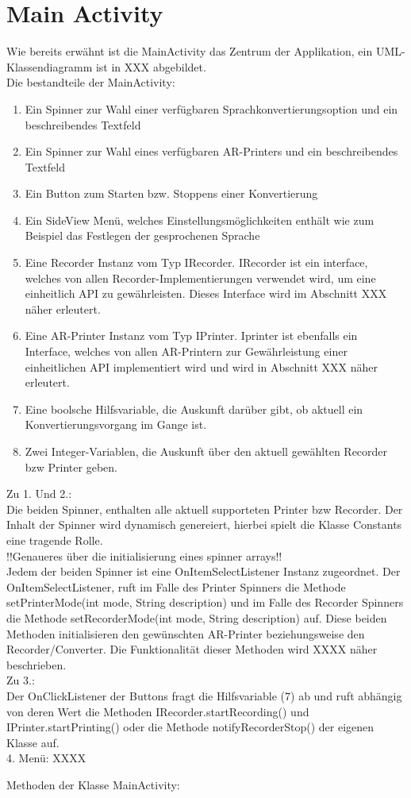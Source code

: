 \section{Main Activity}
Wie bereits erwähnt ist die MainActivity das Zentrum der Applikation, ein UML-Klassendiagramm ist in XXX abgebildet.\\
Die bestandteile der MainActivity:
\begin{enumerate}
	\item Ein Spinner zur Wahl einer verfügbaren Sprachkonvertierungsoption und ein beschreibendes Textfeld
	\item Ein Spinner zur Wahl eines verfügbaren AR-Printers und ein beschreibendes Textfeld
	\item Ein Button zum Starten bzw. Stoppens einer Konvertierung
	\item Ein SideView Menü, welches Einstellungsmöglichkeiten enthält wie zum Beispiel das Festlegen der gesprochenen Sprache
	\item Eine Recorder Instanz vom Typ IRecorder. IRecorder ist ein interface, welches von allen Recorder-Implementierungen verwendet wird, um eine einheitlich API zu gewährleisten. Dieses Interface wird im Abschnitt XXX näher erleutert.
	\item Eine AR-Printer Instanz vom Typ IPrinter. Iprinter ist ebenfalls ein Interface, welches von allen AR-Printern zur Gewährleistung einer einheitlichen API implementiert wird und wird in Abschnitt XXX näher erleutert.
	\item Eine boolsche Hilfsvariable, die Auskunft darüber gibt, ob aktuell ein Konvertierungsvorgang im Gange ist.
	\item Zwei Integer-Variablen, die Auskunft über den aktuell gewählten Recorder bzw Printer geben.
\end{enumerate}
Zu 1. Und 2.:\\
Die beiden Spinner, enthalten alle aktuell supporteten Printer bzw Recorder. Der Inhalt der Spinner wird dynamisch genereiert, hierbei spielt die Klasse Constants eine tragende Rolle.\\
!!Genaueres über die initialisierung eines spinner arrays!!\\
Jedem der beiden Spinner ist eine OnItemSelectListener Instanz zugeordnet. Der OnItemSelectListener, ruft im Falle des Printer Spinners die Methode setPrinterMode(int mode, String description) und im Falle des Recorder Spinners die Methode setRecorderMode(int mode, String description) auf. Diese beiden Methoden initialisieren den gewünschten AR-Printer beziehungsweise den Recorder/Converter. Die Funktionalität dieser Methoden wird XXXX näher beschrieben.\\
Zu 3.:\\
Der OnClickListener der Buttons fragt die Hilfsvariable (7) ab und ruft abhängig von deren Wert die Methoden IRecorder.startRecording() und IPrinter.startPrinting() oder die Methode  notifyRecorderStop() der eigenen Klasse auf.\\
4. Menü: XXXX\par
Methoden der Klasse MainActivity:\\

